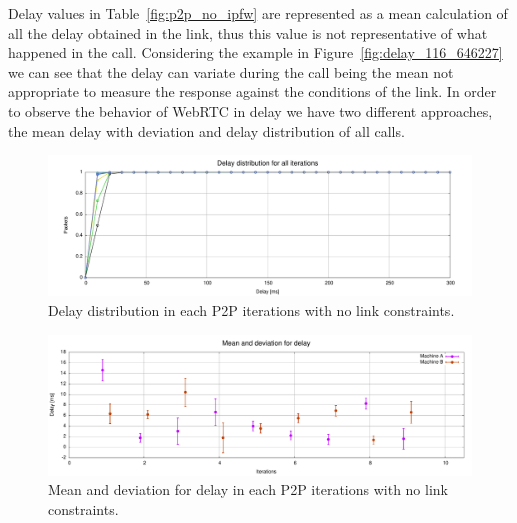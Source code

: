 Delay values in Table~\ref{fig:p2p_no_ipfw} are represented as a mean calculation of all the delay obtained in the link, thus this value is not representative of what happened in the call. Considering the example in Figure~\ref{fig:delay_116_646227} we can see that the delay can variate during the call being the mean not appropriate to measure the response against the conditions of the link. In order to observe the behavior of WebRTC in delay we have two different approaches, the mean delay with deviation and delay distribution of all calls. 

 \begin{figure}[h]
  \centering
    \includegraphics[width=1\textwidth]{./figures/total_delay_distribution_no_ipfw.pdf}
      \caption[Delay distribution in each P2P iterations with no link constraints]{Delay distribution in each P2P iterations with no link constraints.}
	\label{fig:total_delay_distribution_no_ipfw}
\end{figure}

 \begin{figure}[h]
  \centering
    \includegraphics[width=1\textwidth]{./figures/mean_deviation_delay_no_ipfw.pdf}
      \caption[Mean and deviation for delay in each P2P iterations with no link constraints]{Mean and deviation for delay in each P2P iterations with no link constraints.}
	\label{fig:mean_deviation_delay_no_ipfw}
\end{figure}

